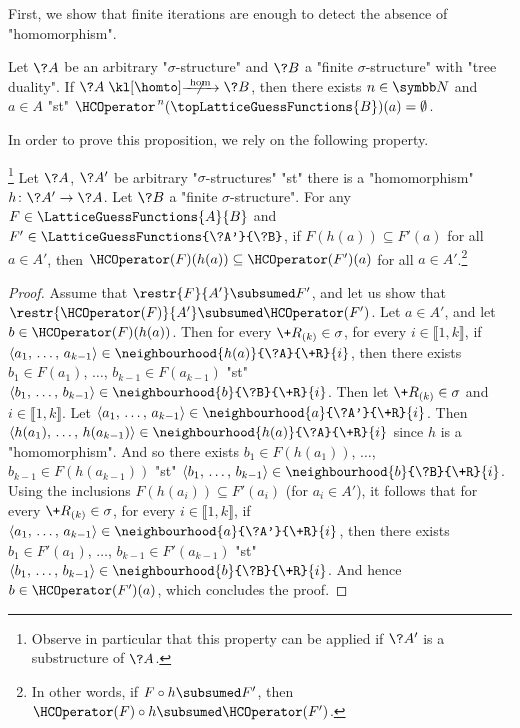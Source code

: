 First, we show that finite iterations are enough to detect the absence of "homomorphism".
\begin{proposition}
	\AP\label{prop:hyperedge-consistency-no-hom}
	Let $\?A$ be an arbitrary "$\sigma$-structure" and $\?B$ a "finite $\sigma$-structure"
	with "tree duality". If $\?A \nothomto \?B$, then there exists $n\in\N$ and $a\in A$ "st"
	$\HCOperator^{\,n}(\topLatticeGuessFunctions{B})(a) = \emptyset$. 
\end{proposition}

In order to prove this proposition, we rely on the following property.
\begin{property}
	\!\footnote{Observe in particular that this property can be applied if $\?A'$ is a
	substructure of $\?A$.}%
	\AP\label{prop:hyperedge-consistency-antimonotonicity}
	Let $\?A$, $\?A'$ be arbitrary "$\sigma$-structures" "st"
	there is a "homomorphism" $h\colon \?A' \to \?A$. Let $\?B$ a "finite $\sigma$-structure".
	For any $F\in \LatticeGuessFunctions{A}{B}$ and $F' \in \LatticeGuessFunctions{\?A'}{\?B}$,
	if $F(h(a)) \subseteq F'(a)$ for all $a\in A'$, then $\HCOperator(F)(h(a)) \subseteq \HCOperator(F')(a)$ for all $a\in A'$.\footnote{In other words, if $F \circ h \subsumed F'$, then
	$\HCOperator(F) \circ h \subsumed \HCOperator(F')$.}
\end{property}

\begin{proof}
	Assume that $\restr{F}{A'} \subsumed F'$, and let us show that 
	$\restr{\HCOperator(F)}{A'} \subsumed \HCOperator(F')$.
	Let $a \in A'$, and let $b \in \HCOperator(F)(h(a))$.
	Then for every $\+R_{(k)} \in \sigma$,
	for every $i \in \lBrack 1,k\rBrack$,
	if $\langle a_1,\, \hdots,\, a_{k-1} \rangle \in \neighbourhood{h(a)}{\?A}{\+R}{i}$,
	then there exists $b_1 \in F(a_1)$, $\hdots$, $b_{k-1} \in F(a_{k-1})$ "st" 
	$\langle b_1,\, \hdots,\, b_{k-1} \rangle \in \neighbourhood{b}{\?B}{\+R}{i}$.
	Then let $\+R_{(k)} \in \sigma$ and $i \in \lBrack 1,k\rBrack$.
	Let $\langle a_1,\, \hdots,\, a_{k-1} \rangle \in \neighbourhood{a}{\?A'}{\+R}{i}$.
	Then $\langle h(a_1),\, \hdots,\, h(a_{k-1}) \rangle \in \neighbourhood{h(a)}{\?A}{\+R}{i}$
	since $h$ is a "homomorphism". And so there exists
	$b_1 \in F(h(a_1))$, $\hdots$, $b_{k-1} \in F(h(a_{k-1}))$ "st" 
	$\langle b_1,\, \hdots,\, b_{k-1} \rangle \in \neighbourhood{b}{\?B}{\+R}{i}$.
	Using the inclusions $F(h(a_i)) \subseteq F'(a_i)$ (for $a_i \in A'$), it follows that
	for every $\+R_{(k)} \in \sigma$, for every $i \in \lBrack 1,k\rBrack$,
	if $\langle a_1,\, \hdots,\, a_{k-1} \rangle \in \neighbourhood{a}{\?A'}{\+R}{i}$, then
	there exists $b_1 \in F'(a_1)$, $\hdots$, $b_{k-1} \in F'(a_{k-1})$
	"st" $\langle b_1,\, \hdots,\, b_{k-1} \rangle \in \neighbourhood{b}{\?B}{\+R}{i}$.
	And hence $b \in \HCOperator(F')(a)$, which concludes the proof.
\end{proof}

